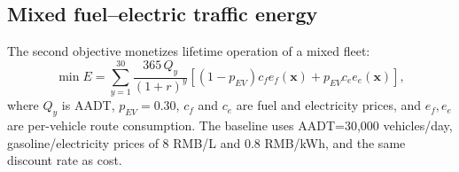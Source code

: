 \documentclass[preprint,12pt]{elsarticle}
\begin{document}
\begin{table}[t]
\centering
\caption{Principal current-model parameters used in the case study.}
\label{tab:parameters}
\end{table}

\subsection{Mixed fuel--electric traffic energy}

The second objective monetizes lifetime operation of a mixed fleet:
\begin{equation}
\min E=\sum_{y=1}^{30}\frac{365\,Q_y}{(1+r)^y}
\left[(1-p_{EV})c_f e_f(\bm x)+p_{EV}c_e e_e(\bm x)\right],
\label{eq:energy}
\end{equation}
where $Q_y$ is AADT, $p_{EV}=0.30$, $c_f$ and $c_e$ are fuel and electricity prices, and $e_f,e_e$ are per-vehicle route consumption. The baseline uses AADT=30,000 vehicles/day, gasoline/electricity prices of 8 RMB/L and 0.8 RMB/kWh, and the same discount rate as cost.
\end{document}

